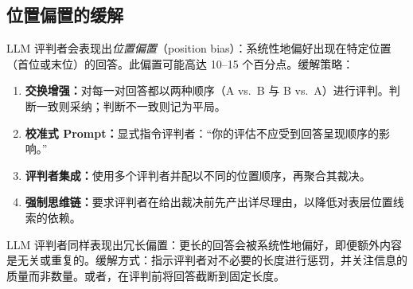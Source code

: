 \subsection{位置偏置的缓解}
\label{position-bias-mitigation}

LLM 评判者会表现出\emph{位置偏置}（position bias）：系统性地偏好出现在特定位置（首位或末位）的回答。此偏置可能高达 10--15 个百分点。缓解策略：

\begin{enumerate}
  \item \textbf{交换增强：}对每一对回答都以两种顺序（A vs.~B 与 B vs.~A）进行评判。判断一致则采纳；判断不一致则记为平局。
  \item \textbf{校准式 Prompt：}显式指令评判者：“你的评估不应受到回答呈现顺序的影响。”
  \item \textbf{评判者集成：}使用多个评判者并配以不同的位置顺序，再聚合其裁决。
  \item \textbf{强制思维链：}要求评判者在给出裁决前先产出详尽理由，以降低对表层位置线索的依赖。
\end{enumerate}

\begin{warningbox}[冗长偏置]
LLM 评判者同样表现出冗长偏置：更长的回答会被系统性地偏好，即便额外内容是无关或重复的。缓解方式：指示评判者对不必要的长度进行惩罚，并关注信息的质量而非数量。或者，在评判前将回答截断到固定长度。
\end{warningbox}

